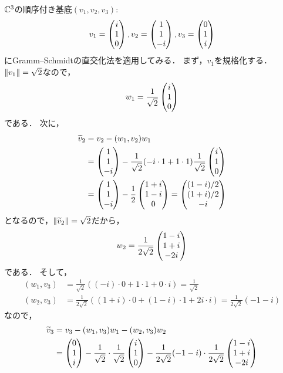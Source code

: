 \begin{example}
$\mathbb{C}^3$の順序付き基底$(v_1,v_2,v_3)$:
\[
  v_1 = \begin{pmatrix} i \\ 1 \\ 0 \end{pmatrix}, v_2 = \begin{pmatrix} 1 \\ 1 \\ -i \end{pmatrix}, v_3 = \begin{pmatrix} 0 \\ 1 \\ i \end{pmatrix}  
\]
にGramm--Schmidtの直交化法を適用してみる．
まず，$v_1$を規格化する．$\left\| v_1 \right\| = \sqrt{2}$なので，
\[
  w_1 = \frac{1}{\sqrt{2}}\begin{pmatrix} i \\ 1 \\ 0 \end{pmatrix}
\]
である．
次に，
\[
  \begin{aligned}
    \widetilde{v}_2 &= v_2 - (w_1, v_2)w_1 \\
    &= \begin{pmatrix} 1 \\ 1 \\ -i \end{pmatrix} - \frac{1}{\sqrt{2}}(-i \cdot 1 + 1 \cdot 1) \frac{1}{\sqrt{2}}\begin{pmatrix} i \\ 1 \\ 0 \end{pmatrix} \\
    &= \begin{pmatrix} 1 \\ 1 \\ -i \end{pmatrix} - \frac{1}{2}\begin{pmatrix} 1+i \\ 1-i \\ 0 \end{pmatrix} = \begin{pmatrix} (1-i)/2 \\ (1+i)/2 \\ -i \end{pmatrix}
  \end{aligned}
\]
となるので，$\left\| \widetilde{v}_2 \right\| = \sqrt{2}$だから，
\[
    w_2 = \frac{1}{2\sqrt{2}} \begin{pmatrix} 1-i \\ 1+i \\ -2i \end{pmatrix}
\]
である．
そして，
\[
  \begin{aligned}
    (w_1,v_3) &= \frac{1}{\sqrt{2}} ((-i)\cdot 0 + 1 \cdot 1 + 0 \cdot i) = \frac{1}{\sqrt{2}}  \\
    (w_2,v_3) &= \frac{1}{2\sqrt{2}} ((1+i)\cdot 0 + (1-i) \cdot 1 + 2i \cdot i) = \frac{1}{2\sqrt{2}}(-1-i)
  \end{aligned}
\]
なので，
\[
  \begin{aligned}
    \tilv_3 &= v_3 - (w_1, v_3)w_1 - (w_2, v_3)w_2\\
    &= \pmt{0 \\ 1 \\ i} %
      - \frac{1}{\sqrt{2}}\cdot \frac{1}{\sqrt{2}}\pmt{i \\ 1 \\ 0} %
      - \frac{1}{2\sqrt{2}}(-1-i) \cdot \frac{1}{2\sqrt{2}} \pmt{1-i \\ 1+i \\ -2i} %

\end{aligned}\]
\end{example}
